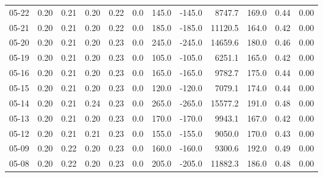 \begin{threeparttable}
{\begin{tabular}{lrrrrrrrrrrr}
  05-22 &          0.20 &          0.21 &          0.20 &        0.22 &                 0.0 &               145.0 &     -145.0 &              8747.7 &            169.0 &            0.44 &                   0.00 \\
  05-21 &          0.20 &          0.21 &          0.20 &        0.22 &                 0.0 &               185.0 &     -185.0 &             11120.5 &            164.0 &            0.42 &                   0.00 \\
  05-20 &          0.20 &          0.21 &          0.20 &        0.23 &                 0.0 &               245.0 &     -245.0 &             14659.6 &            180.0 &            0.46 &                   0.00 \\
  05-19 &          0.20 &          0.21 &          0.20 &        0.23 &                 0.0 &               105.0 &     -105.0 &              6251.1 &            165.0 &            0.42 &                   0.00 \\
  05-16 &          0.20 &          0.21 &          0.20 &        0.23 &                 0.0 &               165.0 &     -165.0 &              9782.7 &            175.0 &            0.44 &                   0.00 \\
  05-15 &          0.20 &          0.21 &          0.20 &        0.23 &                 0.0 &               120.0 &     -120.0 &              7079.1 &            174.0 &            0.44 &                   0.00 \\
  05-14 &          0.20 &          0.21 &          0.24 &        0.23 &                 0.0 &               265.0 &     -265.0 &             15577.2 &            191.0 &            0.48 &                   0.00 \\
  05-13 &          0.20 &          0.21 &          0.20 &        0.23 &                 0.0 &               170.0 &     -170.0 &              9943.1 &            167.0 &            0.42 &                   0.00 \\
  05-12 &          0.20 &          0.21 &          0.21 &        0.23 &                 0.0 &               155.0 &     -155.0 &              9050.0 &            170.0 &            0.43 &                   0.00 \\
  05-09 &          0.20 &          0.22 &          0.20 &        0.23 &                 0.0 &               160.0 &     -160.0 &              9300.6 &            192.0 &            0.49 &                   0.00 \\
  05-08 &          0.20 &          0.22 &          0.20 &        0.23 &                 0.0 &               205.0 &     -205.0 &             11882.3 &            186.0 &            0.48 &                   0.00 \\

\end{tabular}}
\end{threeparttable}
